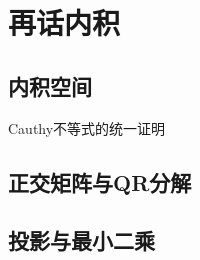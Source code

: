 \section{再话内积}
\subsection{内积空间}
Cauthy不等式的统一证明
\subsection{正交矩阵与QR分解}
\clearpage
\subsection{投影与最小二乘}
\clearpage
